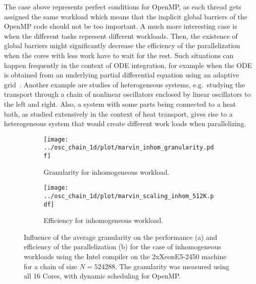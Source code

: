 \documentclass[10pt]{scrartcl}
\begin{document}
The case above represents perfect conditions for OpenMP, as each thread gets assigned the same workload which means that the implicit global barriers of the OpenMP code should not be too important.
A much more interesting case is when the different tasks represent different workloads.
Then, the existence of global barriers might significantly decrease the efficiency of the parallelization when the cores with less work have to wait for the rest.
Such situations can happen frequently in the context of ODE integration, for example when the ODE is obtained from an underlying partial differential equation using an adaptive grid~\cite{?}.
Another example are studies of heterogeneous systems, e.g.\ studying the transport through a chain of nonlinear oscillators enclosed by linear oscillators to the left and right.
Also, a system with some parts being connected to a heat bath, as studied extensively in the context of heat transport, gives rise to a heterogeneous system that would create different work loads when parallelizing.

\begin{figure}
 \begin{subfigure}[b]{0.49\textwidth}
  \centering
  \texttt{[image: ../osc\_chain\_1d/plot/marvin\_inhom\_granularity.pdf]}\hfill
  \caption{Granularity for inhomogeneous workload.} 
  \label{fig:inhom_granularity}
 \end{subfigure}
 \begin{subfigure}[b]{0.49\textwidth}
  \centering
  \texttt{[image: ../osc\_chain\_1d/plot/marvin\_scaling\_inhom\_512K.pdf]}\hfill
  \caption{Efficiency for inhomogeneous workload.} 
  \label{fig:inhom_512K}
 \end{subfigure}
 \caption{Influence of the average granularity on the performance (a) and efficiency of the parallelization (b) for the case of inhomogeneous workloads using the Intel compiler on the 2xXeonE5-2450 machine for a chain of size $N=524288$. The granularity was measured using all 16 Cores, with dynamic scheduling for OpenMP.}
 \label{fig:inhom_1}
\end{figure}
\end{document}

